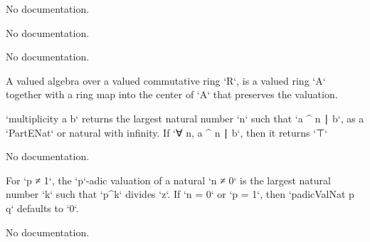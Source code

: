 \begin{definition}
\begin{theorem}\label{Valuation.ltIdeal_eq_top}
                No documentation.
    \end{theorem}

\begin{theorem}\label{DiscreteValuation.leIdeal_eq_ltIdeal_add_one}
                No documentation.
    \end{theorem}

\begin{definition}\label{ValRingHom}
        \leanok
                No documentation.
    \end{definition}

\begin{definition}\label{ValAlgebra}
        \leanok
                A valued algebra over a valued commutative ring `R`, is a valued ring `A` together with a ring map into the center of `A` that preserves the valuation.
    \end{definition}

\begin{definition}\label{multiplicity'}
        \leanok
                `multiplicity a b` returns the largest natural number `n` such that
  `a ^ n ∣ b`, as a `PartENat` or natural with infinity. If `∀ n, a ^ n ∣ b`,
  then it returns `⊤`
    \end{definition}

\begin{theorem}\label{finite_nat_iff'}
                No documentation.
    \end{theorem}

\begin{definition}\label{padicValNat'}
        \leanok
                For `p ≠ 1`, the `p`-adic valuation of a natural `n ≠ 0` is the largest natural number `k` such
that `p^k` divides `z`. If `n = 0` or `p = 1`, then `padicValNat p q` defaults to `0`.
    \end{definition}

\begin{theorem}\label{finite_ideal_iff}
                No documentation.
    \end{theorem}


\end{definition}
